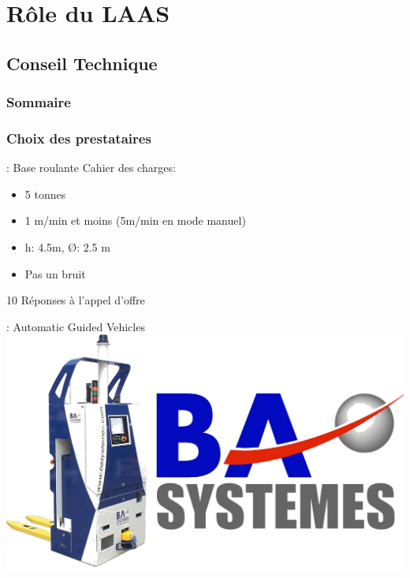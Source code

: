 \documentclass[12pt]{beamer}
\begin{document}
    \section{Rôle du LAAS}
        \subsection{Conseil Technique}
            {\canvasspecial
                \begin{frame}
                    \frametitle{Sommaire}
                \tableofcontents[hideothersubsections]
            \end{frame}}
            \subsubsection{Choix des prestataires}
                \begin{frame}{\subsubsecname: Base roulante}
                    Cahier des charges:
                    \begin{itemize}
                        \item 5 tonnes
                        \item 1 m/min et moins (5m/min en mode manuel)
                        \item h: 4.5m, \O: 2.5 m
                        \item Pas un bruit
                    \end{itemize}
                    10 Réponses à l’appel d’offre
                \end{frame}
                \begin{frame}{\subsubsecname: Automatic Guided Vehicles}
                    \includegraphics[width=\linewidth]{img/ba.png}
                \end{frame}
\end{document}
